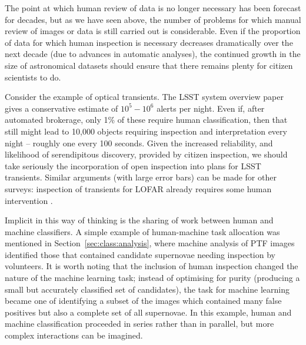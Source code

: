 \documentclass{ar2e}
\def\Sref#1{Section~\ref{#1}\xspace}
\begin{document}
The point at which human review of data is no longer necessary has been forecast
for decades, but as we have seen above, the number of problems for which manual
review of images or data is still carried out is considerable. Even if the
proportion of data for which human inspection is necessary decreases
dramatically over the next decade (due to advances in automatic analyses), the
continued growth in the size of astronomical datasets should ensure that there
remains plenty for citizen scientists to do. 

Consider the example of optical transients. The LSST system overview paper
\citep{LSSTsystem} gives a conservative estimate of $10^5-10^6$ alerts per
night. Even if, after automated brokerage, only 1\% of these require human
classification, then that still might lead to 10,000 objects requiring
inspection and interpretation every night -- roughly one every 100 seconds.
Given the increased reliability, and likelihood of serendipitous discovery,
provided by citizen inspection, we should take seriously the incorporation of
open inspection into plans for LSST transients. Similar arguments (with large
error bars) can be made for other surveys: inspection of transients for LOFAR
already requires some human intervention \citep{LOFAR}. 


Implicit in this way of thinking is the sharing of work between human and
machine classifiers.  A simple example of human-machine task allocation was
mentioned in \Sref{sec:class:analysis}, where machine analysis of PTF images
identified those that contained candidate supernovae needing inspection by
volunteers. It is worth noting that the inclusion of human inspection changed
the nature of the machine learning task; instead of optimising for purity
(producing a small but accurately classified set of candidates), the task for
machine learning became one of identifying a subset of the images which
contained many false positives but also a complete set of all supernovae. 
In this example, human and machine classification proceeded in series rather
than in parallel, but more complex interactions can be imagined. 
\end{document}
